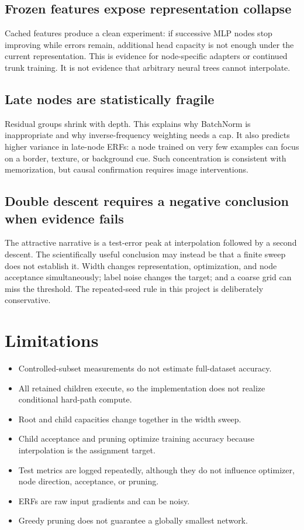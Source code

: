 \documentclass[11pt,a4paper]{article}
\begin{document}
\subsection{Frozen features expose representation collapse}

Cached features produce a clean experiment: if successive MLP nodes stop
improving while errors remain, additional head capacity is not enough under
the current representation. This is evidence for node-specific adapters or
continued trunk training. It is not evidence that arbitrary neural trees
cannot interpolate.

\subsection{Late nodes are statistically fragile}

Residual groups shrink with depth. This explains why BatchNorm is inappropriate
and why inverse-frequency weighting needs a cap. It also predicts higher
variance in late-node ERFs: a node trained on very few examples can focus on a
border, texture, or background cue. Such concentration is consistent with
memorization, but causal confirmation requires image interventions.

\subsection{Double descent requires a negative conclusion when evidence fails}

The attractive narrative is a test-error peak at interpolation followed by a
second descent. The scientifically useful conclusion may instead be that a
finite sweep does not establish it. Width changes representation, optimization,
and node acceptance simultaneously; label noise changes the target; and a
coarse grid can miss the threshold. The repeated-seed rule in this project is
deliberately conservative.

\section{Limitations}

\begin{itemize}
  \item Controlled-subset measurements do not estimate full-dataset accuracy.
  \item All retained children execute, so the implementation does not realize
  conditional hard-path compute.
  \item Root and child capacities change together in the width sweep.
  \item Child acceptance and pruning optimize training accuracy because
  interpolation is the assignment target.
  \item Test metrics are logged repeatedly, although they do not influence
  optimizer, node direction, acceptance, or pruning.
  \item ERFs are raw input gradients and can be noisy.
  \item Greedy pruning does not guarantee a globally smallest network.
\end{itemize}
\end{document}
